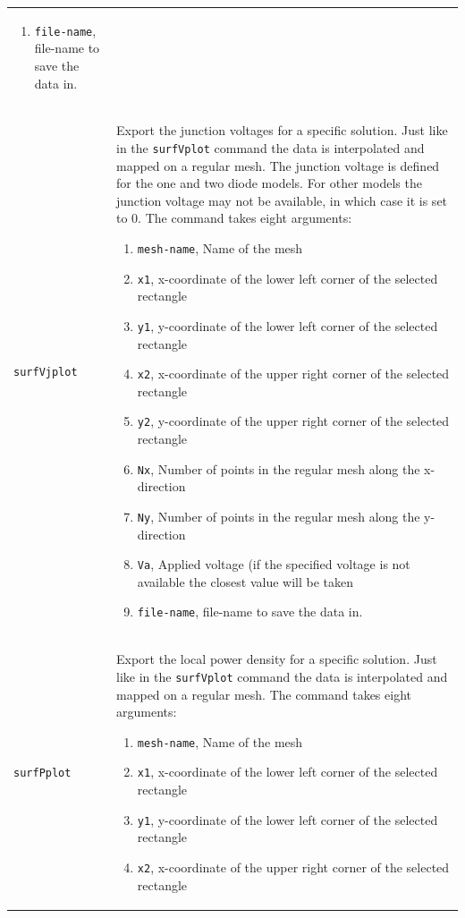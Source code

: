 \documentclass[noshowpacs,preprintnumbers,amsmath,amssymb, letter]{revtex4}
\begin{document}
\begin{longtable}{p{}p{}}
\begin{enumerate}
\item \texttt{file-name}, file-name to save the data in.
\end{enumerate}\\
\texttt{surfVjplot}		& Export the junction voltages for a specific solution. Just like in the \texttt{surfVplot} command the data is interpolated and mapped on a regular mesh. The junction voltage is defined for the one and two diode models. For other models the junction voltage may not be available, in which case it is set to 0. The command takes eight arguments:
\begin{enumerate}
\item \texttt{mesh-name}, Name of the mesh
\item \texttt{x1}, x-coordinate of the lower left corner of the selected rectangle
\item \texttt{y1}, y-coordinate of the lower left corner of the selected rectangle
\item \texttt{x2}, x-coordinate of the upper right corner of the selected rectangle
\item \texttt{y2}, y-coordinate of the upper right corner of the selected rectangle
\item \texttt{Nx}, Number of points in the regular mesh along the x-direction
\item \texttt{Ny}, Number of points in the regular mesh along the y-direction
\item \texttt{Va}, Applied voltage (if the specified voltage is not available the closest value will be taken
\item \texttt{file-name}, file-name to save the data in.
\end{enumerate}\\
\texttt{surfPplot}		& Export the local power density for a specific solution. Just like in the \texttt{surfVplot} command the data is interpolated and mapped on a regular mesh. The command takes eight arguments:
\begin{enumerate}
\item \texttt{mesh-name}, Name of the mesh
\item \texttt{x1}, x-coordinate of the lower left corner of the selected rectangle
\item \texttt{y1}, y-coordinate of the lower left corner of the selected rectangle
\item \texttt{x2}, x-coordinate of the upper right corner of the selected rectangle

\end{enumerate}
\end{longtable}
\end{document}
